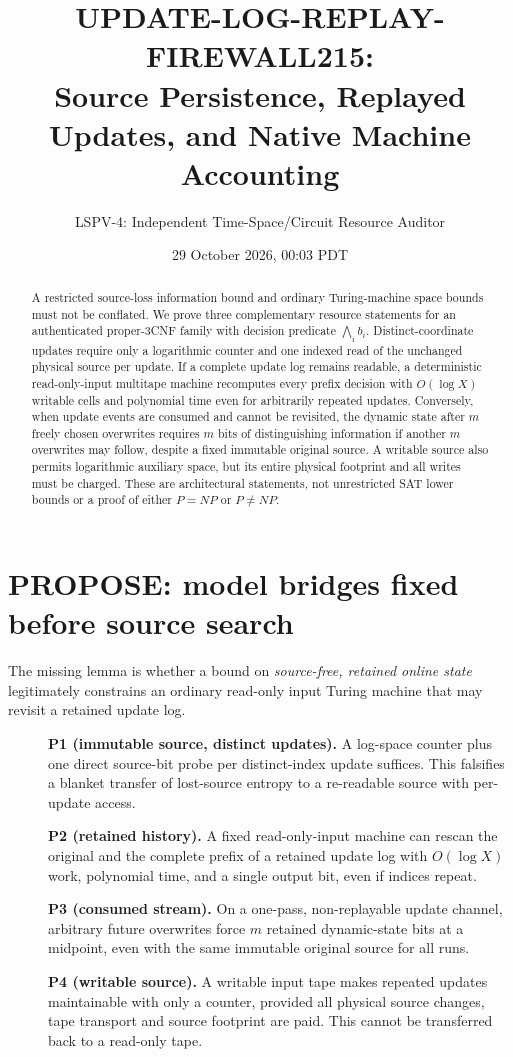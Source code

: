 \documentclass[11pt]{article}
\title{UPDATE-LOG-REPLAY-FIREWALL215:\\Source Persistence, Replayed Updates, and Native Machine Accounting}
\author{LSPV-4: Independent Time-Space/Circuit Resource Auditor}
\date{29 October 2026, 00:03 PDT}
\begin{document}
\maketitle
\begin{abstract}
A restricted source-loss information bound and ordinary Turing-machine
space bounds must not be conflated.  We prove three complementary
resource statements for an authenticated proper-3CNF family with decision
predicate $\bigwedge_i b_i$.  Distinct-coordinate updates require only a
logarithmic counter and one indexed read of the unchanged physical source
per update.  If a complete update log remains readable, a deterministic
read-only-input multitape machine recomputes every prefix decision with
$O(\log X)$ writable cells and polynomial time even for arbitrarily repeated
updates.  Conversely, when update events are consumed and cannot be
revisited, the dynamic state after $m$ freely chosen overwrites requires
$m$ bits of distinguishing information if another $m$ overwrites may
follow, despite a fixed immutable original source.  A writable source
also permits logarithmic auxiliary space, but its entire physical footprint
and all writes must be charged.  These are architectural statements,
not unrestricted SAT lower bounds or a proof of either $P=NP$ or $P\ne NP$.
\end{abstract}

\section{PROPOSE: model bridges fixed before source search}
The missing lemma is whether a bound on \emph{source-free, retained online
state} legitimately constrains an ordinary read-only input Turing machine
that may revisit a retained update log.
\begin{description}
\item[]\textbf{P1 (immutable source, distinct updates).}
A log-space counter plus one direct source-bit probe per distinct-index
update suffices.  This falsifies a blanket transfer of lost-source entropy
to a re-readable source with per-update access.
\item[]\textbf{P2 (retained history).}
A fixed read-only-input machine can rescan the original and the complete
prefix of a retained update log with $O(\log X)$ work, polynomial time,
and a single output bit, even if indices repeat.
\item[]\textbf{P3 (consumed stream).}
On a one-pass, non-replayable update channel, arbitrary future overwrites
force $m$ retained dynamic-state bits at a midpoint, even with the same
immutable original source for all runs.
\item[]\textbf{P4 (writable source).}
A writable input tape makes repeated updates maintainable with only a
counter, provided all physical source changes, tape transport and source
footprint are paid.  This cannot be transferred back to a read-only tape.
\end{description}
\end{document}
